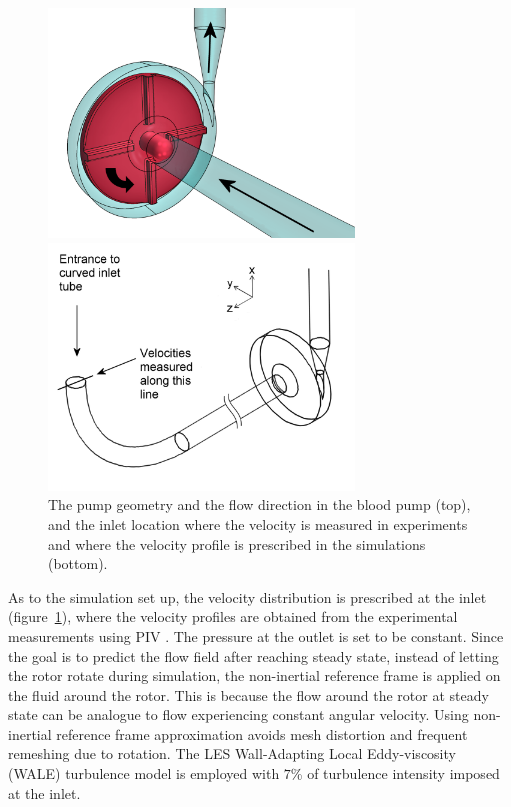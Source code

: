 \begin{figure}[htbp]
    \centering
    \begin{minipage}[c][2.5in][c]{0.9\linewidth}
        \centering
        \includegraphics[width=3.2in]{imgs/nozzle_pump/housing_and_rotor.png}
    \end{minipage}
    \begin{minipage}[c][2.5in][c]{0.9\linewidth}
        \centering
        \includegraphics[width=3.2in]{imgs/nozzle_pump/inlet_velcocity_profile_location.png}
    \end{minipage}
    \caption{The pump geometry and the flow direction in the blood pump (top), and the inlet location where the velocity is measured in experiments and where the velocity profile is prescribed in the simulations (bottom).}
    \label{fig:pumpgeo}
\end{figure}

As to the simulation set up, the velocity distribution is prescribed at the inlet (figure~\ref{fig:pumpgeo}), where the velocity profiles are obtained from the experimental measurements using PIV \cite{cpi}. The pressure at the outlet is set to be constant. Since the goal is to predict the flow field after reaching steady state, instead of letting the rotor rotate during simulation, the non-inertial reference frame is applied on the fluid around the rotor. This is because the flow around the rotor at steady state can be analogue to flow experiencing constant angular velocity. Using non-inertial reference frame approximation avoids mesh distortion and frequent remeshing due to rotation. The LES Wall-Adapting Local Eddy-viscosity (WALE) turbulence model is employed with $7$\% of turbulence intensity imposed at the inlet. 

